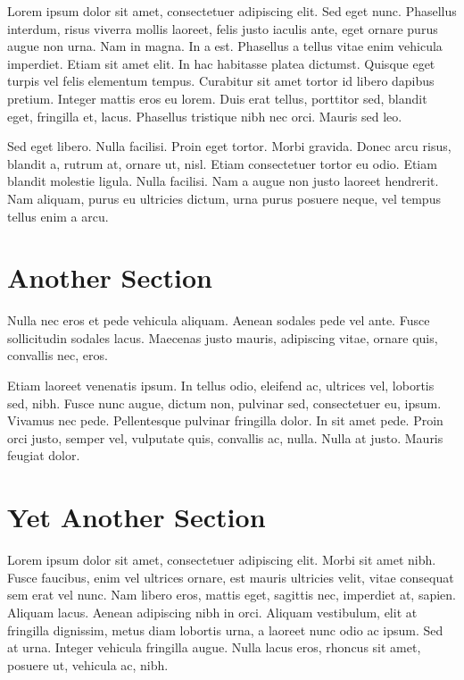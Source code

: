 Lorem ipsum dolor sit amet, consectetuer adipiscing elit. 
Sed eget nunc. Phasellus interdum, risus viverra mollis laoreet, felis
justo iaculis ante, eget ornare purus augue non urna. Nam in magna. In a
est. Phasellus a tellus vitae enim vehicula imperdiet. Etiam sit amet
elit. In hac habitasse platea dictumst. Quisque eget turpis vel felis
elementum tempus. Curabitur sit amet tortor id libero dapibus
pretium. Integer mattis eros eu lorem. Duis erat tellus, porttitor
sed, blandit eget, fringilla et, lacus. Phasellus tristique nibh nec
orci. Mauris sed leo. 

Sed eget libero. Nulla facilisi. Proin eget tortor. Morbi
gravida. Donec arcu risus, blandit a, rutrum at, ornare ut,
nisl. Etiam consectetuer tortor eu odio. Etiam blandit molestie
ligula. Nulla facilisi. Nam a augue non justo laoreet hendrerit. Nam
aliquam, purus eu ultricies dictum, urna purus posuere neque, vel
tempus tellus enim a arcu. 

\section{Another Section} \label{sec:another}

Nulla nec eros et pede vehicula aliquam. Aenean sodales pede vel
ante. Fusce sollicitudin sodales lacus. Maecenas justo mauris,
adipiscing vitae, ornare quis, convallis nec, eros. 

Etiam laoreet venenatis ipsum. 
In tellus odio, eleifend ac, ultrices vel, lobortis sed, nibh. 
Fusce nunc augue, dictum non, pulvinar sed, consectetuer eu, ipsum. 
Vivamus nec pede. Pellentesque pulvinar fringilla dolor. 
In sit amet pede. Proin orci justo, semper vel, vulputate quis,
convallis ac, nulla. Nulla at justo. Mauris feugiat dolor.

\section{Yet Another Section} \label{sec:yet another}

Lorem ipsum dolor sit amet, consectetuer adipiscing elit. Morbi sit
amet nibh. Fusce faucibus, enim vel ultrices ornare, est mauris
ultricies velit, vitae consequat sem erat vel nunc. Nam libero eros,
mattis eget, sagittis nec, imperdiet at, sapien. Aliquam lacus. Aenean
adipiscing nibh in orci. Aliquam vestibulum, elit at fringilla
dignissim, metus diam lobortis urna, a laoreet nunc odio ac ipsum. Sed
at urna. Integer vehicula fringilla augue. Nulla lacus eros, rhoncus
sit amet, posuere ut, vehicula ac, nibh. 

